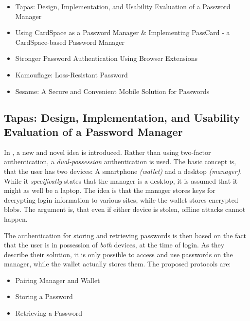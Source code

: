 		\begin{itemize}
			\item Tapas: Design, Implementation, and Usability Evaluation of a Password Manager \cite{tapas}
			\item Using CardSpace as a Password Manager \& Implementing PassCard - a CardSpace-based Password Manager \cite{cardspace,cardspace_impl}
			\item Stronger Password Authentication Using Browser Extensions
			\item Kamouflage: Loss-Resistant Password
			\item Sesame: A Secure and Convenient Mobile Solution for Passwords
		\end{itemize}
		







		\subsection*{Tapas: Design, Implementation, and Usability Evaluation of a Password Manager}
			In \cite{tapas}, a new and novel idea is introduced. Rather than using two-factor authentication, a \emph{dual-possession} authentication is used. The basic concept is, that the user has two devices: A smartphone \emph{(wallet)} and a desktop \emph{(manager)}. While it \emph{specifically} states that the manager is a desktop, it is assumed that it might as well be a laptop. The idea is that the manager stores keys for decrypting login information to various sites, while the wallet stores encrypted blobs. The argument is, that even if either device is stolen, offline attacks cannot happen.

			The authentication for storing and retrieving passwords is then based on the fact that the user is in possession of \emph{both} devices, at the time of login. As they describe their solution, it is only possible to access and use passwords on the manager, while the wallet actually stores them. The proposed protocols are:
			\begin{itemize}
				\item Pairing Manager and Wallet
				\item Storing a Password
				\item Retrieving a Password
			\end{itemize}

